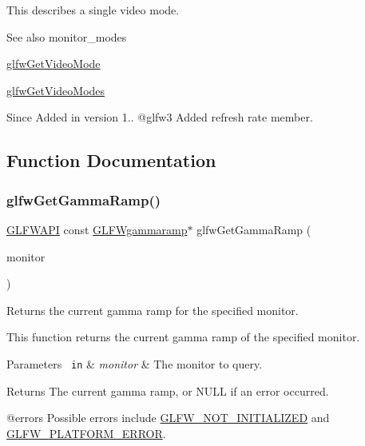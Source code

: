 This describes a single video mode.

\begin{DoxySeeAlso}{See also}
monitor\+\_\+modes 

\mbox{\hyperlink{group__monitor_gac234b63ec525c70d7e18ac84aca088c6}{glfw\+Get\+Video\+Mode}} 

\mbox{\hyperlink{group__monitor_ga811c28d61595e630774389985947c665}{glfw\+Get\+Video\+Modes}}
\end{DoxySeeAlso}
\begin{DoxySince}{Since}
Added in version 1.. @glfw3 Added refresh rate member. 
\end{DoxySince}


\subsection{Function Documentation}
\mbox{\label{group__monitor_gaeeac9198f3c91b83440eed679441f76b}} 
\subsubsection{\texorpdfstring{glfwGetGammaRamp()}{glfwGetGammaRamp()}}
{\footnotesize\ttfamily \mbox{\hyperlink{glfw3_8h_a56da5036b2cc259351ae22fd6439bb47}{G\+L\+F\+W\+A\+PI}} const \mbox{\hyperlink{struct_g_l_f_wgammaramp}{G\+L\+F\+Wgammaramp}}$\ast$ glfw\+Get\+Gamma\+Ramp (\begin{DoxyParamCaption}\item[{\mbox{\hyperlink{group__monitor_ga8d9efd1cde9426692c73fe40437d0ae3}{G\+L\+F\+Wmonitor}} $\ast$}]{monitor }\end{DoxyParamCaption})}



Returns the current gamma ramp for the specified monitor. 

This function returns the current gamma ramp of the specified monitor.


\begin{DoxyParams}[1]{Parameters}
\mbox{\texttt{ in}}  & {\em monitor} & The monitor to query. \\
\hline
\end{DoxyParams}
\begin{DoxyReturn}{Returns}
The current gamma ramp, or {\ttfamily N\+U\+LL} if an error occurred.
\end{DoxyReturn}
@errors Possible errors include \mbox{\hyperlink{group__errors_ga2374ee02c177f12e1fa76ff3ed15e14a}{G\+L\+F\+W\+\_\+\+N\+O\+T\+\_\+\+I\+N\+I\+T\+I\+A\+L\+I\+Z\+ED}} and \mbox{\hyperlink{group__errors_gad44162d78100ea5e87cdd38426b8c7a1}{G\+L\+F\+W\+\_\+\+P\+L\+A\+T\+F\+O\+R\+M\+\_\+\+E\+R\+R\+OR}}.


